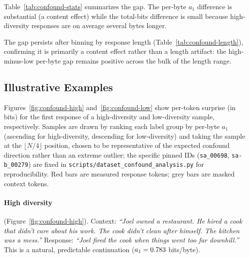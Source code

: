 Table~\ref{tab:confound-stats} summarizes the gap.
The per-byte $a_1$ difference is substantial (a content effect) while the total-bits difference is small because high-diversity responses are on average several bytes longer.

\begin{table}[!htbp]
\centering
\caption{Unconditional surprise ($a_1$) by diversity label, McDiv\_nuggets story\_gen.}\label{tab:confound-stats}

\end{table}

The gap persists after binning by response length (Table~\ref{tab:confound-length}), confirming it is primarily a content effect rather than a length artifact: the high-minus-low per-byte gap remains positive across the bulk of the length range.

\begin{table}[!htbp]
\centering
\caption{Unconditional per-byte surprise by response length bin, story\_gen.}\label{tab:confound-length}

\end{table}

\subsection{Illustrative Examples}\label{sec:mcdiv-examples}

Figures~\ref{fig:confound-high} and~\ref{fig:confound-low} show per-token surprise (in bits) for the first response of a high-diversity and low-diversity sample, respectively.
Samples are drawn by ranking each label group by per-byte $a_1$ (ascending for high-diversity, descending for low-diversity) and taking the sample at the $\lfloor N/4 \rfloor$ position, chosen to be representative of the expected confound direction rather than an extreme outlier; the specific pinned IDs (\texttt{sa\_00698}, \texttt{sa-b\_00279}) are fixed in \texttt{scripts/dataset\_confound\_analysis.py} for reproducibility.
Red bars are measured response tokens; grey bars are masked context tokens.

\paragraph{High diversity} (Figure~\ref{fig:confound-high}).
Context: \emph{``Joel owned a restaurant.
He hired a cook that didn't care about his work.
The cook didn't clean after himself.
The kitchen was a mess.''} Response: \emph{``Joel fired the cook when things went too far downhill.''} This is a natural, predictable continuation ($a_1 = 0.783$ bits/byte).

